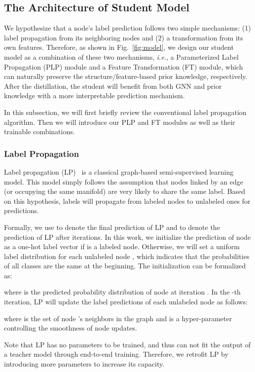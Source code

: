 \documentclass[sigconf]{acmart}
\begin{document}
\subsection{The Architecture of Student Model}
We hypothesize that a node's label prediction follows two simple mechanisms: (1) label propagation from its neighboring nodes and (2) a transformation from its own features. Therefore, as shown in Fig.~\ref{fig:model}, we design our student model as a combination of these two mechanisms, \textit{i.e.}, a Parameterized Label Propagation (PLP) module and a Feature Transformation (FT) module, which can naturally preserve the structure/feature-based prior knowledge, respectively. After the distillation, the student will benefit from both GNN and prior knowledge with a more interpretable prediction mechanism.

In this subsection, we will first briefly review the conventional label propagation algorithm. Then we will introduce our PLP and FT modules as well as their trainable combinations. 
\subsubsection{Label Propagation}
Label propagation (LP)~\cite{zhu2002learning} is a classical graph-based semi-supervised learning model. This model simply follows the assumption that nodes linked by an edge (or occupying the same manifold) are very likely to share the same label. Based on this hypothesis, labels will propagate from labeled nodes to unlabeled ones for predictions.

Formally, we use  to denote the final prediction of LP and  to denote the prediction of LP after  iterations. In this work, we initialize the prediction of node  as a one-hot label vector if  is a labeled node. Otherwise, we will set a uniform label distribution for each unlabeled node , which indicates that the probabilities of all classes are the same at the beginning. The initialization can be formalized as:

where  is the predicted probability distribution of node  at iteration . In the -th iteration, LP will update the label predictions of each unlabeled node  as follows:

where  is the set of node 's neighbors in the graph and  is a hyper-parameter controlling the smoothness of node updates.

Note that LP has no parameters to be trained, and thus can not fit the output of a teacher model through end-to-end training. Therefore, we retrofit LP by introducing more parameters to increase its capacity.
\end{document}
